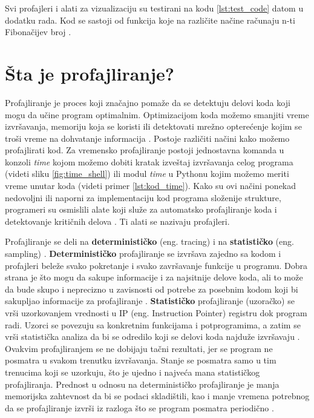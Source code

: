\documentclass[a4paper]{article}
\begin{document}
Svi profajleri i alati za vizualizaciju su testirani na kodu \ref{lst:test_code} datom u dodatku rada. Kod se sastoji od funkcija koje na različite načine računaju n-ti Fibonačijev broj \cite{fib}.

\section{Šta je profajliranje?}	
\label{sec:profajliranje}

Profajliranje je proces koji značajno pomaže da se detektuju delovi koda koji mogu da učine program optimalnim. Optimizacijom koda možemo smanjiti vreme izvršavanja, memoriju koja se koristi ili detektovati mrežno opterećenje kojim se troši vreme na dohvatanje informacija \cite{mit}. Postoje različiti načini kako možemo profajlirati kod. Za vremensko profajliranje postoji jednostavna komanda u konzoli {\em time} kojom možemo dobiti kratak izveštaj izvršavanja celog programa (videti sliku \ref{fig:time_shell}) ili modul {\em time} u Pythonu kojim možemo meriti vreme unutar koda (videti primer \ref{lst:kod_time}). Kako su ovi načini ponekad nedovoljni ili naporni za implementaciju kod programa složenije strukture, programeri su osmislili alate koji služe za automatsko profajliranje koda i detektovanje kritičnih delova \cite{vanderplas2016python}. Ti alati se nazivaju profajleri.

Profajliranje se deli na \textbf{determinističko} (eng. tracing) i na \textbf{statističko} (eng. sampling) \cite{VizList}. \textbf{Determinističko} profajliranje se izvršava zajedno sa kodom i profajleri beleže svako pokretanje i svako završavanje funkcije u programu. Dobra strana je što mogu da sakupe informacije i za najsitnije delove koda, ali to može da bude skupo i neprecizno u zavisnosti od potrebe za posebnim kodom koji bi sakupljao informacije za profajliranje \cite{cProfile}. \textbf{Statističko} profajliranje (uzoračko) se vrši uzorkovanjem vrednosti u IP (eng. Instruction Pointer) registru dok program radi. Uzorci se povezuju sa konkretnim funkcijama i potprogramima, a zatim se vrši statistička analiza da bi se odredilo koji se delovi koda najduže izvršavaju \cite{StatProf1}. Ovakvim profajliranjem se ne dobijaju tačni rezultati, jer se program ne posmatra u svakom trenutku izvršavanja. Stanje se posmatra samo u tim trenucima koji se uzorkuju, što je ujedno i najveća mana statističkog profajliranja. Prednost u odnosu na determinističko profajliranje je manja memorijska zahtevnost da bi se podaci skladištili, kao i manje vremena potrebnog da se profajliranje izvrši iz razloga što se program posmatra periodično \cite{StatProf2}.
\end{document}
